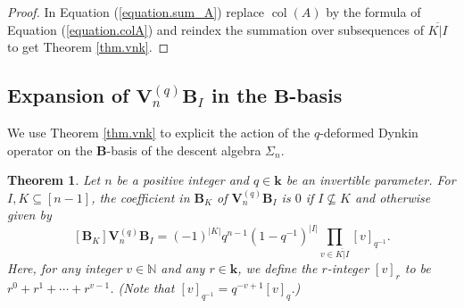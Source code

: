 \documentclass[revision]{FPSAC2025}
\newtheorem{theorem}{Theorem}
\newcommand{\NN}{\mathbb{N}} %
\newcommand{\kk}{\mathbf{k}} %
\newcommand{\col}{\operatorname{col}}
\begin{document}
\begin{proof}
\noindent In Equation (\ref{equation.sum_A}) replace $\col(A)$ by the formula of Equation (\ref{equation.colA}) and reindex the summation over subsequences of $\overline{ K|I}$ to get Theorem \ref{thm.vnk}. 
\end{proof}

\subsection{Expansion of $\mathbf{V}_{n}^{(q)}\mathbf{B}_I$ in the $\mathbf{B}$-basis}

We use Theorem \ref{thm.vnk} to explicit the action of the $q$-deformed Dynkin operator on the $\mathbf{B}$-basis of the descent algebra $\Sigma_n$. 

\begin{theorem}
\label{thm.vnq}
Let $n$ be a positive integer and $q \in \mathbf{k}$ be an invertible parameter.
For $I, K \subseteq [n-1]$, the coefficient in $\mathbf{B}_K$ of $\mathbf{V}^{(q)}_n\mathbf{B}_I$ is $0$ if $I \nsubseteq K$ and otherwise given by
\begin{equation}
\label{equation.thm.vnq}
[\mathbf{B}_K]\mathbf{V}^{(q)}_n\mathbf{B}_I
= (-1)^{|K|} q^{n-1} (1-q^{-1})^{|I|} \prod_{v \in \overline{ K|I}}[v]_{q^{-1}}.
\end{equation}
Here, for any integer $v \in \NN$ and any $r \in \kk$, we define the $r$-integer $[v]_r$ to be $r^0 + r^1 + \cdots + r^{v-1}$. (Note that $[v]_{q^{-1}} = q^{-v+1} [v]_q$.)
\end{theorem}
\end{document}
